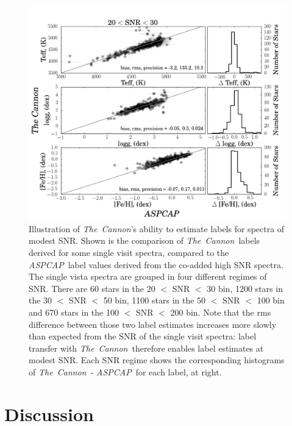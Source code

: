 \documentclass[12pt, preprint]{aastex}
\newcommand{\tc}{\textsl{The~Cannon}}
\newcommand{\aspcap}{\textsl{ASPCAP}}
\begin{document}
\begin{figure}[!h]
\includegraphics[scale=0.25]{./plots/SNR20to30.png}
    \caption{Illustration of \tc's ability to estimate labels for spectra of modest SNR. Shown is the comparison of \tc\ labels derived for some single visit spectra, compared to the \aspcap\ label values derived from the co-added high SNR spectra. The single vista spectra are grouped in four different regimes of SNR. There are 60 stars in the 20 $<$  SNR $<$ 30 bin, 1200 stars in the 30 $<$ SNR $<$ 50 bin, 1100 stars in the 50 $<$ SNR $<$ 100 bin and 670 stars in the 100 $<$  SNR $<$ 200 bin. Note that the rms difference between those two label estimates increases more slowly than expected from the SNR of the single visit spectra: label transfer with \tc\  therefore enables label estimates at modest SNR. Each SNR regime shows the corresponding histograms of \tc\ - \aspcap\ for each label, at right.}
\label{fig:SNR}
\end{figure}

\clearpage
\section{Discussion}
\end{document}
